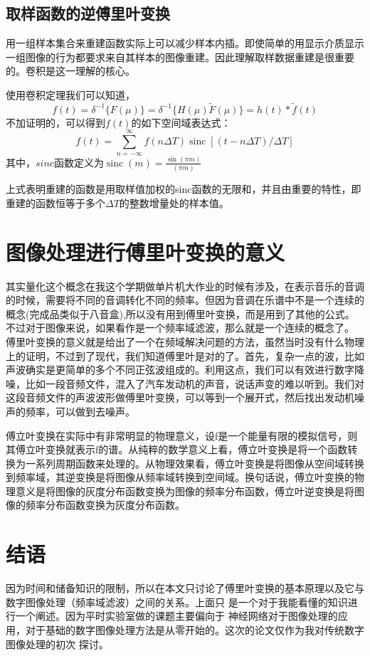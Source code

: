 \documentclass[UTF8,a4paper]{ctexart}
\begin{document}
	\subsection{取样函数的逆傅里叶变换}
	用一组样本集合来重建函数实际上可以减少样本内插。即使简单的用显示介质显示一组图像的行为都要求来自其样本的图像重建。因此理解取样数据重建是很重要的。卷积是这一理解的核心。\par
	使用卷积定理我们可以知道，
	\begin{equation}f(t)=\delta^{-1}\{F(\mu)\}=\delta^{-1}\{H(\mu) \tilde{F}(\mu)\}=h(t) * \tilde{f}(t)\end{equation}
	不加证明的，可以得到$f(t)$的如下空间域表达式：
	\begin{equation}f(t)=\sum_{n=-\infty}^{\infty} f(n \Delta T) \operatorname{sinc}[(t-n \Delta T) / \Delta T]\end{equation}
	其中，$sinc$函数定义为$\operatorname{sinc}(m)=\frac{\sin (\pi m)}{(\pi m)}$\par
	上式表明重建的函数是用取样值加权的sinc函数的无限和，并且由重要的特性，即重建的函数恒等于多个$\Delta T$的整数增量处的样本值。
\section{图像处理进行傅里叶变换的意义}
其实量化这个概念在我这个学期做单片机大作业的时候有涉及，在表示音乐的音调的时候，需要将不同的音调转化不同的频率。但因为音调在乐谱中不是一个连续的概念(完成品类似于八音盒),所以没有用到傅里叶变换，而是用到了其他的公式。不过对于图像来说，如果看作是一个频率域滤波，那么就是一个连续的概念了。
傅里叶变换的意义就是给出了一个在频域解决问题的方法，虽然当时没有什么物理上的证明，不过到了现代，我们知道傅里叶是对的了。首先，复杂一点的波，比如声波确实是更简单的多个不同正弦波组成的。利用这点，我们可以有效进行数字降噪，比如一段音频文件，混入了汽车发动机的声音，说话声变的难以听到。我们对这段音频文件的声波波形做傅里叶变换，可以等到一个展开式，然后找出发动机噪声的频率，可以做到去噪声。\par
傅立叶变换在实际中有非常明显的物理意义，设f是一个能量有限的模拟信号，则其傅立叶变换就表示f的谱。从纯粹的数学意义上看，傅立叶变换是将一个函数转换为一系列周期函数来处理的。从物理效果看，傅立叶变换是将图像从空间域转换到频率域，其逆变换是将图像从频率域转换到空间域。换句话说，傅立叶变换的物理意义是将图像的灰度分布函数变换为图像的频率分布函数，傅立叶逆变换是将图像的频率分布函数变换为灰度分布函数。

\section{结语}
因为时间和储备知识的限制，所以在本文只讨论了傅里叶变换的基本原理以及它与数字图像处理（频率域滤波）之间的关系。上面只
是一个对于我能看懂的知识进行一个阐述。因为平时实验室做的课题主要偏向于
神经网络对于图像处理的应用，对于基础的数字图像处理方法是从零开始的。这次的论文仅作为我对传统数字图像处理的初次
探讨。





\end{document}
